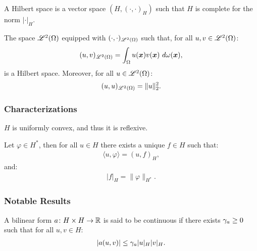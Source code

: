 \begin{definition} %
    A Hilbert space is a vector space $(H, (\cdot, \cdot)_H)$ such that $H$ is complete for the norm $\lvert \cdot \rvert_H$.
\end{definition}

\begin{remark}
    The space $\mathscr{L}^{2}(\Omega)$ equipped with $(\cdot, \cdot)_{\mathscr{L}^{2}(\Omega)}$ such that, for all $u, v \in \mathscr{L}^{2}(\Omega)$:
    \begin{align}
        (u, v)_{\mathscr{L}^{2}(\Omega)} = \int_{\Omega} u(\bm{x}) v(\bm{x}) ~ d \omega(\bm{x}),
    \end{align}
    is a Hilbert space. Moreover, for all $u \in \mathscr{L}^{2}(\Omega)$:
    \begin{align}
        (u, u)_{\mathscr{L}^{2}(\Omega)} = \lVert u \rVert_2^2.
    \end{align}
\end{remark}

\subsubsection{Characterizations}

\begin{theorem}
    $H$ is uniformly convex, and thus it is reflexive.
\end{theorem}

\begin{theorem}
    Let $\varphi \in H^*$, then for all $u \in H$ there exists a unique $f \in H$ such that:
    \begin{align}
        \langle u, \varphi \rangle = (u, f)_H,
    \end{align}
    and:
    \begin{align}
        \lvert f \rvert_H = \lVert \varphi \rVert_{H^*}.
    \end{align}
\end{theorem}

\newpage
\subsubsection{Notable Results}

\begin{definition}
    A bilinear form $a \colon H \times H \rightarrow \mathbb{R}$ is said to be continuous if there exists $\gamma_{a} \geq 0$ such that for all $u, v \in H$:
    \begin{align}
        \lvert a(u, v) \rvert \leq \gamma_{a} \lvert u \rvert_H \lvert v \rvert_H.
    \end{align}
\end{definition}

